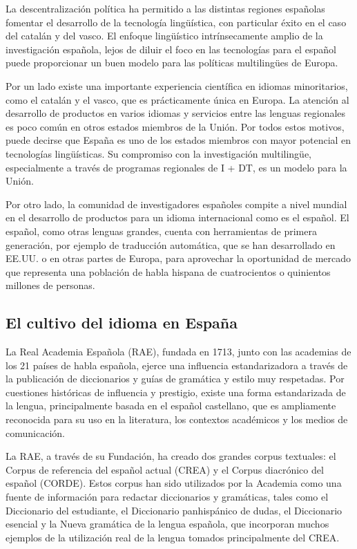 \begin{multicols}{2}
La descentralización política ha permitido a las distintas regiones españolas fomentar el desarrollo de la tecnología lingüística, con particular éxito en el caso del catalán y del vasco. El enfoque lingüístico intrínsecamente amplio de la investigación española, lejos de diluir el foco en las tecnologías para el español puede proporcionar un buen modelo para las políticas multilingües de Europa.

Por un lado existe una importante experiencia científica en  idiomas minoritarios, como el catalán y el vasco, que es prácticamente única en Europa. La atención al desarrollo de productos en varios idiomas y servicios entre las lenguas regionales es poco común en otros estados miembros de la Unión. Por todos estos motivos, puede decirse que España es uno de los estados miembros con mayor potencial en tecnologías lingüísticas. Su compromiso con la investigación multilingüe, especialmente a través de programas regionales de I + DT, es un modelo para la Unión.

Por otro lado, la comunidad de investigadores  españoles compite a nivel mundial en el desarrollo de productos para un idioma internacional como es el español. El español, como otras lenguas grandes, cuenta con herramientas de primera generación, por ejemplo de traducción automática, que se han desarrollado en  EE.UU. o en otras partes de Europa, para aprovechar la oportunidad de mercado que representa  una población de habla hispana de cuatrocientos o quinientos millones de personas.

\subsection{El cultivo del idioma en España}

La Real Academia Española (RAE), fundada en 1713, junto con las academias de los 21 países de habla española, ejerce una influencia estandarizadora a través de la publicación de diccionarios y guías de gramática y estilo muy respetadas. Por cuestiones históricas de influencia y prestigio, existe una forma estandarizada de la lengua, principalmente basada en el español castellano, que es ampliamente reconocida para su uso en la literatura, los contextos académicos y los medios de comunicación.


La RAE, a través de su Fundación, ha creado dos grandes corpus textuales: el Corpus de referencia del español actual (CREA) y el Corpus diacrónico del español (CORDE). Estos corpus han sido utilizados por la Academia como una fuente de información para redactar diccionarios y gramáticas, tales como el Diccionario del estudiante, el Diccionario panhispánico de dudas, el Diccionario esencial y la Nueva gramática de la lengua española, que incorporan muchos ejemplos de la utilización real de la lengua tomados principalmente del CREA.


\end{multicols}
